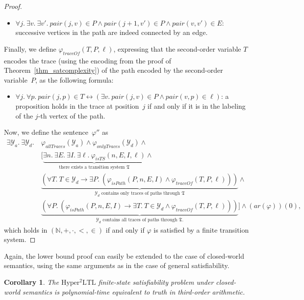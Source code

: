 \documentclass[dvipsnames,10pt,a4paper]{amsart}
\newtheorem{cor}[thm]{Corollary}
\theoremstyle{definition}
\theoremstyle{remark}
\newcommand{\nats}{\mathbb{N}}
\renewcommand{\phi}{\varphi}
\newcommand{\sohyltl}{\mathrm{Hyper^2LTL}\xspace}
\newcommand{\tsys}{\mathfrak{T}}
\newcommand{\arithmetize}{{\mathit{ar}}}
\newcommand{\pair}{\mathit{pair}}
\newcommand{\onlytraces}{\mathit{onlyTraces}}
\newcommand{\alltraces}{\mathit{allTraces}}
\newcommand{\calY}{\mathcal{Y}}
\newcommand{\ists}{\mathit{isTS}}
\newcommand{\ispath}{\mathit{isPath}}
\newcommand{\traceof}{\mathit{traceOf}}
\newcommand{\natsstruct}{(\nats, +, \cdot, <, \in)}
\begin{document}
\begin{proof}
\begin{itemize}
    \item $\forall j.\ \exists v.\ \exists v'.\ \pair(j,v) \in P \wedge \pair(j+1, v') \in P \wedge \pair(v,v') \in E $: successive vertices in the path are indeed connected by an edge.
\end{itemize}

Finally, we define $\phi_\traceof(T, P, \ell)$, expressing that the second-order variable $T$ encodes the trace (using the encoding from the proof of Theorem~\ref{thm_satcomplexity}) of the path encoded by the second-order variable~$P$, as the  following formula:
\begin{itemize}
    \item $\forall j.\ \forall p.\ \pair(j,p) \in T \leftrightarrow (\exists v.\ \pair(j,v) \in P \wedge \pair(v,p) \in \ell)$: a proposition holds in the trace at position~$j$ if and only if it is in the labeling of the $j$-th vertex of the path.
\end{itemize}

Now, we define the sentence~$\phi''$ as 
\begin{align*}
\exists \calY_a.\ \exists\calY_d.\ {}&{} \phi_\alltraces(\calY_a) \wedge \phi_\onlytraces(\calY_d) \wedge\\
%
&{}\Big[\underbrace{\exists n.\ \exists E.\ \exists I.\ \exists \ell.\ \phi_\ists(n, E, I, \ell)}_{\text{there exists a transition system~$\tsys$}} \wedge \\
&{}\underbrace{(\forall T.\ T \in \calY_d \rightarrow \exists P.\ (\phi_\ispath(P, n, E, I) \wedge \phi_\traceof(T,P, \ell)))}_{\text{$\calY_d$ contains only traces of paths through $\tsys$}}\wedge\\
%
&{}\underbrace{( \forall P.\ (\phi_\ispath(P, n,E,I) \rightarrow \exists T.\ T \in \calY_d \wedge \phi_\traceof(T,P, \ell)) )}_{\text{$\calY_d$ contains all traces of paths through $\tsys$.}}\Big]\wedge  (\arithmetize(\phi))(0),
\end{align*}
which holds in $\natsstruct$ if and only if $\phi$ is satisfied by a finite transition system.
\end{proof}


Again, the lower bound proof can easily be extended to the case of closed-world semantics, using the same arguments as in the case of general satisfiability.

\begin{cor}
\label{cor_finsatcomplexity_cw}
The $\sohyltl$ finite-state satisfiability problem under closed-world semantics is polynomial-time equivalent to truth in third-order arithmetic.
\end{cor}
\end{document}
